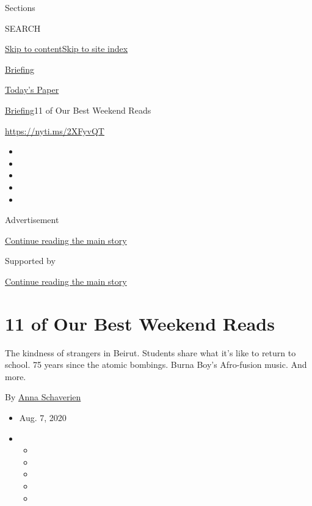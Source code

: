Sections

SEARCH

\protect\hyperlink{site-content}{Skip to
content}\protect\hyperlink{site-index}{Skip to site index}

\href{https://www.nytimes.com/interactive/2018/briefing/global-morning-briefing-newsletter-signup.html}{Briefing}

\href{https://myaccount.nytimes.com/auth/login?response_type=cookie\&client_id=vi}{}

\href{https://www.nytimes.com/section/todayspaper}{Today's Paper}

\href{/interactive/2018/briefing/global-morning-briefing-newsletter-signup.html}{Briefing}\textbar{}11
of Our Best Weekend Reads

\href{https://nyti.ms/2XFyvQT}{https://nyti.ms/2XFyvQT}

\begin{itemize}
\item
\item
\item
\item
\item
\end{itemize}

Advertisement

\protect\hyperlink{after-top}{Continue reading the main story}

Supported by

\protect\hyperlink{after-sponsor}{Continue reading the main story}

\hypertarget{11-of-our-best-weekend-reads}{%
\section{11 of Our Best Weekend
Reads}\label{11-of-our-best-weekend-reads}}

The kindness of strangers in Beirut. Students share what it's like to
return to school. 75 years since the atomic bombings. Burna Boy's
Afro-fusion music. And more.

By \href{https://www.nytimes.com/by/anna-schaverien}{Anna Schaverien}

\begin{itemize}
\item
  Aug. 7, 2020
\item
  \begin{itemize}
  \item
  \item
  \item
  \item
  \item
  \end{itemize}
\end{itemize}

